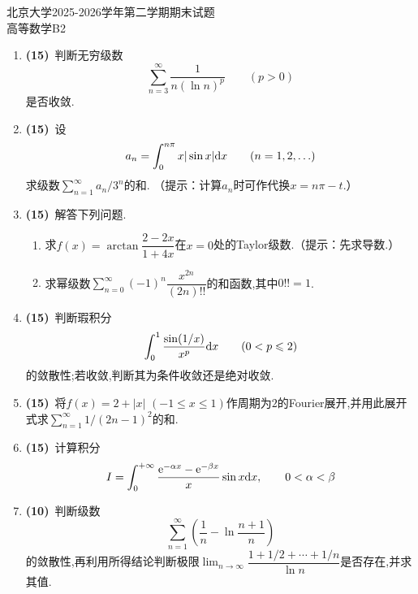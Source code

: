 \documentclass{ctexart}
\begin{document}
\pagestyle{empty}
\begin{center}\Large
北京大学2025-2026学年第二学期期末试题\\
    高等数学B2
\end{center}
\begin{enumerate}[leftmargin=*,label=\textbf{\arabic*.},topsep=0pt,parsep=0pt,itemsep=0pt,partopsep=0pt]
    \item \textbf{(15)}\ 判断无穷级数
\[\sum_{n=3}^{\infty}\frac1{n(\ln n)^p}\qquad(p>0)\]
是否收敛.

    \item \textbf{(15)}\ 设
\[a_n=\int_0^{n\pi}x|\sin x|\mathrm{d} x\qquad(n=1,2,\ldots)\]
求级数$\displaystyle\sum_{n=1}^{\infty}a_n/3^n$的和.
（提示：计算$a_n$时可作代换$x=n\pi-t$.）

    \item \textbf{(15)}\ 解答下列问题.
\begin{enumerate}[label=\tbf{(\arabic*)},topsep=0pt,parsep=0pt,itemsep=0pt,partopsep=0pt]
\item 求$f(x)=\arctan\dfrac{2-2x}{1+4x}$在$x=0$处的Taylor级数.（提示：先求导数.）
\item 求幂级数$\displaystyle\sum_{n=0}^{\infty}(-1)^n\dfrac{x^{2n}}{(2n)!!}$的和函数,其中$0!!=1$.
\end{enumerate}

    \item \textbf{(15)}\ 判断瑕积分
\[\int_0^1\frac{\sin(1/x)}{x^p}\mathrm{d} x\qquad(0<p\leqslant2)\]
的敛散性;若收敛,判断其为条件收敛还是绝对收敛.

    \item \textbf{(15)}\ 将$f(x)=2+|x|$ $(-1\leqslant x\leqslant1)$作周期为$2$的Fourier展开,并用此展开式求$\displaystyle\sum_{n=1}^{\infty}1/(2n-1)^2$的和.

    \item \textbf{(15)}\ 计算积分
\[I=\int_0^{+\infty}\frac{\mathrm{e}^{-\alpha x}-\mathrm{e}^{-\beta x}}x\sin x\mathrm{d} x,
\qquad 0<\alpha<\beta\]

    \item \textbf{(10)}\ 判断级数
\[\sum_{n=1}^{\infty}\left(\frac1n-\ln\frac{n+1}{n}\right)\]
的敛散性,再利用所得结论判断极限$\displaystyle\lim_{n\to\infty}\dfrac{1+1/2+\cdots+1/n}{\ln n}$是否存在,并求其值.

\end{enumerate}
\end{document}
